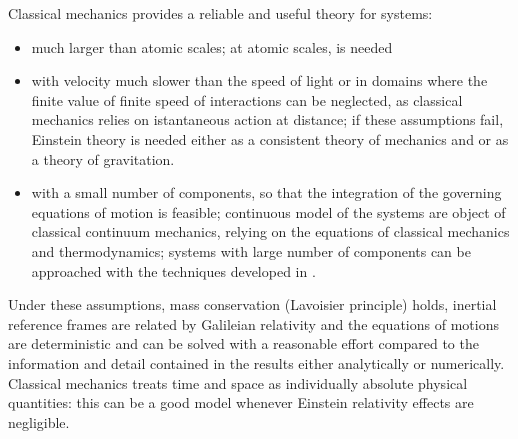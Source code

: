 \documentclass[letterpaper,10pt,english]{jupyterBook}
\begin{document}
\sphinxAtStartPar
Classical mechanics provides a reliable and useful theory for systems:
\begin{itemize}
\item {} 
\sphinxAtStartPar
much larger than atomic scales; at atomic scales,  is needed

\item {} 
\sphinxAtStartPar
with velocity much slower than the speed of light or in domains where the finite value of finite speed of interactions can be neglected, as classical mechanics relies on istantaneous action at distance; if these assumptions fail, Einstein theory is needed either  \sphinxhyphen{} as a consistent theory of mechanics and  \sphinxhyphen{} or  \sphinxhyphen{} as a theory of gravitation.

\item {} 
\sphinxAtStartPar
with a small number of components, so that the integration of the governing equations of motion is feasible; continuous model of the systems are object of classical continuum mechanics, relying on the equations of classical mechanics and thermodynamics; systems with large number of components can be approached with the techniques developed in .

\end{itemize}

\sphinxAtStartPar
Under these assumptions, mass conservation (Lavoisier principle) holds, inertial reference frames are related by Galileian relativity and the equations of motions are deterministic and can be solved with a reasonable effort \sphinxhyphen{} compared to the information and detail contained in the results \sphinxhyphen{} either analytically or numerically.
Classical mechanics treats time and space as individually absolute physical quantities: this can be a good model whenever Einstein relativity effects are negligible.





\sphinxstepscope
\end{document}
